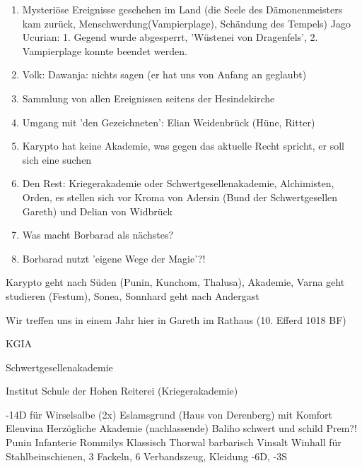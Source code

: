 \begin{enumerate}
\item  Mysteriöse Ereignisse geschehen im Land (die Seele des Dämonenmeisters kam zurück, Menschwerdung(Vampierplage), Schändung des Tempels)
Jago Ucurian: 1. Gegend wurde abgesperrt, 'Wüstenei von Dragenfels', 2. Vampierplage konnte beendet werden. 
\item Volk: Dawanja: nichts sagen (er hat uns von Anfang an geglaubt)
\item Sammlung von allen Ereignissen seitens der Hesindekirche
\item Umgang mit 'den Gezeichneten': Elian Weidenbrück (Hüne, Ritter)
\item Karypto hat keine Akademie, was gegen das aktuelle Recht spricht, er soll sich eine suchen
\item Den Rest: Kriegerakademie oder Schwertgesellenakademie, Alchimisten, Orden, es stellen sich vor Kroma von Adersin (Bund der Schwertgesellen Gareth) und Delian von Widbrück  
\item Was macht Borbarad als nächstes? 
\item Borbarad nutzt 'eigene Wege der Magie'?!
\end{enumerate}

Karypto geht nach Süden (Punin, Kunchom, Thalusa), Akademie, Varna geht studieren (Festum), Sonea, Sonnhard geht nach Andergast 

Wir treffen uns in einem Jahr hier in Gareth im Rathaus (10. Efferd 1018 BF)

KGIA

Schwertgesellenakademie

Institut Schule der Hohen Reiterei (Kriegerakademie)

-14D für Wirselsalbe (2x)
Eslamsgrund (Haus von Derenberg) mit Komfort
Elenvina Herzögliche Akademie (nachlassende)
Baliho schwert und schild
Prem?!
Punin Infanterie
Rommilys Klassisch
Thorwal barbarisch
Vinsalt 
Winhall
 für Stahlbeinschienen, 3 Fackeln, 6 Verbandszeug, Kleidung
-6D, -3S

